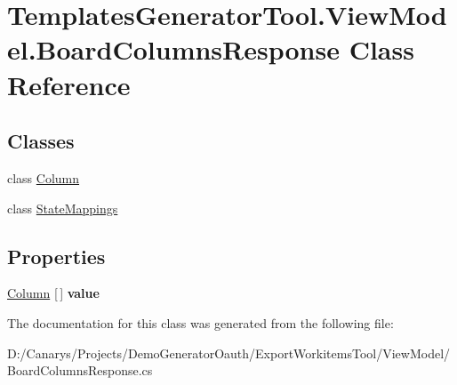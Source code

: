 \hypertarget{class_templates_generator_tool_1_1_view_model_1_1_board_columns_response}{}\section{Templates\+Generator\+Tool.\+View\+Model.\+Board\+Columns\+Response Class Reference}
\label{class_templates_generator_tool_1_1_view_model_1_1_board_columns_response}
\subsection*{Classes}
\begin{DoxyCompactItemize}
\item 
class \mbox{\hyperlink{class_templates_generator_tool_1_1_view_model_1_1_board_columns_response_1_1_column}{Column}}
\item 
class \mbox{\hyperlink{class_templates_generator_tool_1_1_view_model_1_1_board_columns_response_1_1_state_mappings}{State\+Mappings}}
\end{DoxyCompactItemize}
\subsection*{Properties}
\begin{DoxyCompactItemize}
\item 
\mbox{\label{class_templates_generator_tool_1_1_view_model_1_1_board_columns_response_a76a64c770b5ee6bb623a071bca283df8}} 
\mbox{\hyperlink{class_templates_generator_tool_1_1_view_model_1_1_board_columns_response_1_1_column}{Column}} \mbox{[}$\,$\mbox{]} {\bfseries value}
\end{DoxyCompactItemize}


The documentation for this class was generated from the following file\+:\begin{DoxyCompactItemize}
\item 
D\+:/\+Canarys/\+Projects/\+Demo\+Generator\+Oauth/\+Export\+Workitems\+Tool/\+View\+Model/Board\+Columns\+Response.\+cs\end{DoxyCompactItemize}
